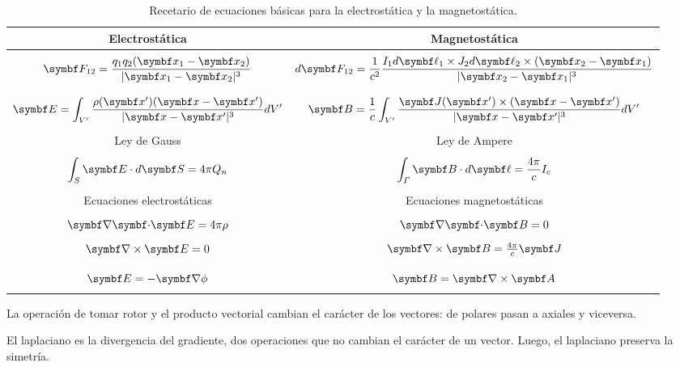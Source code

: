 \documentclass[10pt,oneside]{CBFT_book}
\begin{document}
	\begin{table}[ht]
	\centering
        \begin{tabular}{|c|c|}
		\hline
		Electrostática & Magnetostática \\
		\hline 
		 & \\
		$\displaystyle \vb{F}_{12} = \frac{q_1 q_2 ( \vb{x}_1 - \vb{x}_2 )}{ |\vb{x}_1 - \vb{x}_2|^3 } $
		& 
		$ \displaystyle d\vb{F}_{12} = \frac{1}{c^2} \frac{ I_1 d\vb{\ell}_1 \times J_2 d\vb{\ell}_2 \times ( \vb{x}_2 - \vb{x}_1 )}
		{ |\vb{x}_2 - \vb{x}_1|^3 }$
		\\
		 & \\
		\hline
		& \\
		$\displaystyle{\vb{E} = \int_{V'} \frac{\rho(\vb{x}')(\vb{x}-\vb{x}')}{|\vb{x}-\vb{x}'|^3} dV' 
		}$ & $\displaystyle{\vb{B} = \frac{1}{c} \int_{V'} \frac{\vb{J}(\vb{x}') \times 
		(\vb{x}-\vb{x}')}{|\vb{x}-\vb{x}'|^3} dV'}$ \\
		& \\
		\hline
		Ley de Gauss & Ley de Ampere \\
		& \\
		$\displaystyle{\int_S \vb{E}\cdot d\vb{S} = 4\pi Q_n}$ &
		$\displaystyle{\int_\Gamma \vb{B}\cdot d\vb{\ell} = \frac{4\pi}{c} I_c}$ \\
		& \\
		\hline
		Ecuaciones electrostáticas & Ecuaciones magnetostáticas \\
		&\\
		$\divem{E} = 4\pi\rho$ & $\divem{B} = 0$ \\
		&\\
		$\rotorm{E} = 0$ & $\rotorm{B} = \frac{4\pi}{c}\vb{J}$ \\
		& \\
		\hline
		& \\
		$\vb{E} = - \Nabla\phi$ & $\vb{B} = \rotorm{A}$ \\
		& \\
		\hline
		\end{tabular} 
		\caption{Recetario de ecuaciones básicas para la electrostática y la
		magnetostática.}
	\end{table} 

La operación de tomar rotor y el producto vectorial cambian el carácter de los vectores: de
polares pasan a axiales y viceversa.

El laplaciano es la divergencia del gradiente, dos operaciones que no cambian el carácter de
un vector. Luego, el laplaciano preserva la simetría.
\end{document}
